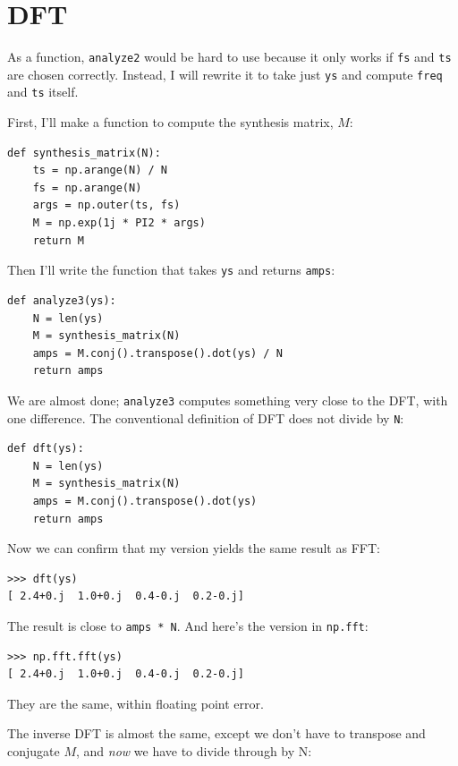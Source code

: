 \documentclass[12pt]{book}
\begin{document}
\section{DFT}
\label{dftsection}

As a function, {\tt analyze2} would be hard to use because it
only works if {\tt fs} and {\tt ts} are chosen correctly.
Instead, I will rewrite it to take just {\tt ys} and compute {\tt freq}
and {\tt ts} itself.

First, I'll make a function to compute the synthesis matrix, $M$:

\begin{verbatim}
def synthesis_matrix(N):
    ts = np.arange(N) / N
    fs = np.arange(N)
    args = np.outer(ts, fs)
    M = np.exp(1j * PI2 * args)
    return M
\end{verbatim}

Then I'll write the function that takes {\tt ys} and returns
{\tt amps}:

\begin{verbatim}
def analyze3(ys):
    N = len(ys)
    M = synthesis_matrix(N)
    amps = M.conj().transpose().dot(ys) / N
    return amps
\end{verbatim}

We are almost done; {\tt analyze3} computes something very
close to the DFT, with one difference.  The conventional definition
of DFT does not divide by {\tt N}:

\begin{verbatim}
def dft(ys):
    N = len(ys)
    M = synthesis_matrix(N)
    amps = M.conj().transpose().dot(ys)
    return amps
\end{verbatim}

Now we can confirm that my version yields the same result as
FFT:

\begin{verbatim}
>>> dft(ys)
[ 2.4+0.j  1.0+0.j  0.4-0.j  0.2-0.j]
\end{verbatim}

The result is close to {\tt amps * N}.
And here's the version in {\tt np.fft}:

\begin{verbatim}
>>> np.fft.fft(ys)
[ 2.4+0.j  1.0+0.j  0.4-0.j  0.2-0.j]
\end{verbatim}

They are the same, within floating point error.

The inverse DFT is almost the same, except we don't have to transpose
and conjugate $M$, and {\em now} we have to divide through by N:
\end{document}
